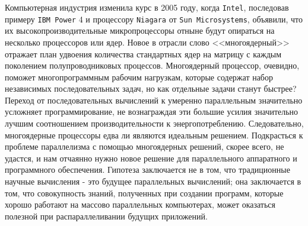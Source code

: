 
Компьютерная индустрия изменила курс в 2005 году, когда \texttt{Intel}, последовав примеру \texttt{IBM Power} 4 и процессору \texttt{Niagara} от \texttt{Sun Microsystems}, объявили, что их высокопроизводительные микропроцессоры отныне будут опираться на несколько процессоров или ядер.
Новое в отрасли слово <<многоядерный>> отражает план удвоения количества стандартных ядер на матрицу с каждым поколением полупроводниковых процессов.
Многоядерный процессор, очевидно, поможет многопрограммным рабочим нагрузкам, которые содержат набор независимых последовательных задач, но как отдельные задачи станут быстрее?
Переход от последовательных вычислений к умеренно параллельным значительно усложняет программирование, не вознаграждая эти большие усилия значительно лучшим соотношением производительности к энергопотреблению.
Следовательно, многоядерные процессоры едва ли являются идеальным решением.
Подкрасться к проблеме параллелизма с помощью многоядерных решений, скорее всего, не удастся, и нам отчаянно нужно новое решение для параллельного аппаратного и программного обеспечения.
Гипотеза заключается не в том, что традиционные научные вычисления - это будущее
параллельных вычислений; она заключается в том, что совокупность знаний, полученных при создании программ, которые
хорошо работают на массово параллельных компьютерах, может оказаться полезной при распараллеливании будущих
приложений.

